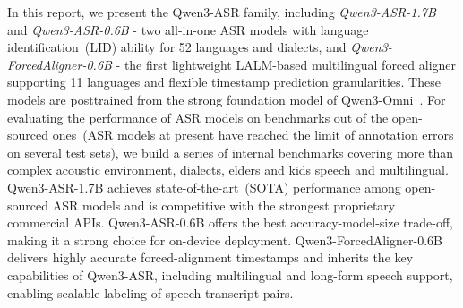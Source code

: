 

In this report, we present the Qwen3-ASR family, including \textit{Qwen3-ASR-1.7B} and \textit{Qwen3-ASR-0.6B} - two all-in-one ASR models with language identification~(LID) ability for 52 languages and dialects, and \textit{Qwen3-ForcedAligner-0.6B} - the first lightweight LALM-based multilingual forced aligner supporting 11 languages and flexible timestamp prediction granularities. These models are posttrained from the strong foundation model of Qwen3-Omni~\citep{qwen3-omni}. For evaluating the performance of ASR models on benchmarks out of the open-sourced ones~(ASR models at present have reached the limit of annotation errors on several test sets), we build a series of internal benchmarks covering more than complex acoustic environment, dialects, elders and kids speech and multilingual. Qwen3-ASR-1.7B achieves state-of-the-art~(SOTA) performance among open-sourced ASR models and is competitive with the strongest proprietary commercial APIs. Qwen3-ASR-0.6B offers the best accuracy-model-size trade-off, making it a strong choice for on-device deployment. Qwen3-ForcedAligner-0.6B delivers highly accurate forced-alignment timestamps and inherits the key capabilities of Qwen3-ASR, including multilingual and long-form speech support, enabling scalable labeling of speech-transcript pairs.

